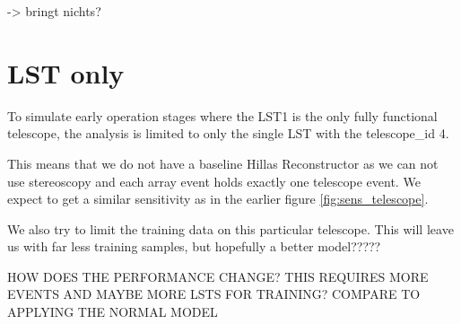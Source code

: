 -> bringt nichts?

\iffalse
\section{LST only}
To simulate early operation stages where the LST1 is the only fully functional 
telescope, the analysis is limited to only the single LST with 
the telescope\_id 4.

This means that we do not have a baseline Hillas Reconstructor as we can not use
stereoscopy and each array event holds exactly one telescope event.
We expect to
get a similar sensitivity as in the earlier figure \ref{fig:sens_telescope}.

We also try to limit the training data on this particular telescope.
This will leave us with far less training samples, but hopefully
a better model?????

HOW DOES THE PERFORMANCE CHANGE?
THIS REQUIRES MORE EVENTS AND MAYBE MORE LSTS FOR TRAINING?
COMPARE TO APPLYING THE NORMAL MODEL

